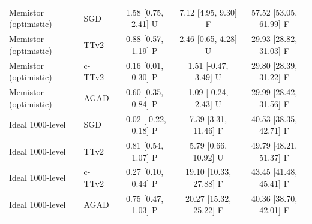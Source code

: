 \begin{table}[t]
\begin{tabular}{llccc}
Memistor (optimistic) & SGD & 1.58 [0.75, 2.41] U & 7.12 [4.95, 9.30] F & 57.52 [53.05, 61.99] F\\
Memistor (optimistic) & TTv2 & 0.88 [0.57, 1.19] P & 2.46 [0.65, 4.28] U & 29.93 [28.82, 31.03] F\\
Memistor (optimistic) & c-TTv2 & 0.16 [0.01, 0.30] P & 1.51 [-0.47, 3.49] U & 29.80 [28.39, 31.22] F\\
Memistor (optimistic) & AGAD & 0.60 [0.35, 0.84] P & 1.09 [-0.24, 2.43] U & 29.99 [28.42, 31.56] F\\
Ideal 1000-level & SGD & -0.02 [-0.22, 0.18] P & 7.39 [3.31, 11.46] F & 40.53 [38.35, 42.71] F\\
Ideal 1000-level & TTv2 & 0.81 [0.54, 1.07] P & 5.79 [0.66, 10.92] U & 49.79 [48.21, 51.37] F\\
Ideal 1000-level & c-TTv2 & 0.27 [0.10, 0.44] P & 19.10 [10.33, 27.88] F & 43.45 [41.48, 45.41] F\\
Ideal 1000-level & AGAD & 0.75 [0.47, 1.03] P & 20.27 [15.32, 25.22] F & 40.36 [38.70, 42.01] F\\
\bottomrule\end{tabular}\end{table}
